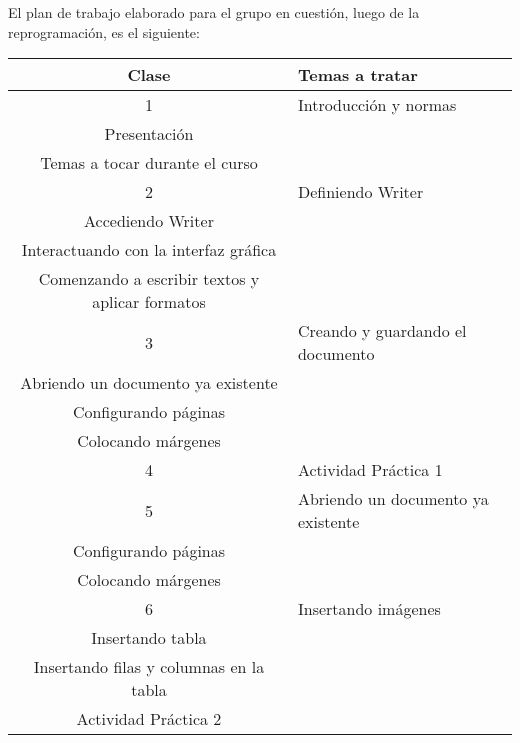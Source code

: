             El plan de trabajo elaborado para el grupo en cuestión, luego de la reprogramación, es el siguiente:
			\begin{center}
                
		
            \begin{tabular}{|c|p{10cm}|}
						\hline
                        \textbf{Clase} & \textbf{Temas a tratar} 
                        \\ \hline
                        1 & \raggedright Introducción y normas
                        \\ Presentación
                        \\ Temas a tocar durante el curso
                        \tabularnewline \hline
                        2 & \raggedright Definiendo Writer
                        \\ Accediendo Writer
                        \\ Interactuando con la interfaz gráfica
                        \\ Comenzando a escribir textos y aplicar formatos
                        \tabularnewline \hline
                        3 & \raggedright Creando y guardando el documento 
                        \\ Abriendo un documento ya existente
                        \\ Configurando páginas
                        \\ Colocando márgenes
                        \tabularnewline \hline
                        
                        4 & \raggedright Actividad Práctica 1
                        \tabularnewline \hline
                        
                        5 & \raggedright Abriendo un documento ya existente
                        \\ Configurando páginas
                        \\ Colocando márgenes
                        \tabularnewline \hline

                        6 & \raggedright Insertando imágenes
                        \\ Insertando tabla
                        \\ Insertando filas y columnas en la tabla
                        \\ Actividad Práctica 2
                        \tabularnewline \hline   
                                             

\end{tabular}
\end{center}
